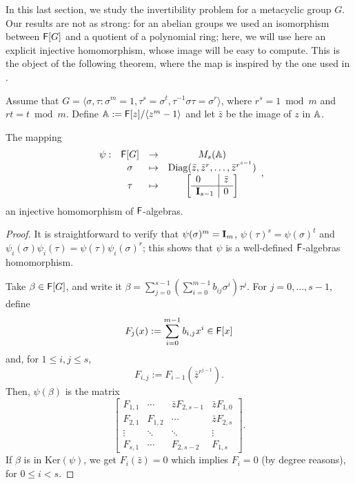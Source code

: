 In this last section, we study the invertibility problem for a
metacyclic group $G$. Our results are not as strong: for an abelian
groups we used an isomorphism between ${\mathsf{F}}[G]$ and a quotient of a
polynomial ring; here, we will use here an explicit injective
homomorphism, whose image will be easy to compute. This is the object
of the following theorem, where the map is inspired by the one used in
\cite[\S 47]{Curtis}.

Assume that $G = \langle \sigma , \tau : \sigma^m = 1, \tau^s =
\sigma^t, \tau^{-1} \sigma \tau = \sigma^r \rangle$, where $r^s = 1
\bmod m$ and $rt = t \bmod m$. Define $\mathbb{A}:={\mathsf{F}}[z]/\langle z^m-1\rangle$
and let $\bar{z}$ be the image of $z$ in $\mathbb{A}$.

\begin{lemma}\label{prop:metinjection}
The mapping
$$\begin{array}{cccc}
\psi:& \F [G]& \to& M_s(\A) \\
&\sigma &\mapsto& \mathrm{Diag}(\bar{z}, \bar{z}^r , \ldots, \bar{z}^{r^{s-1}})\\
&\tau &\mapsto &
\left[ \begin{array}{l|l}
0 & \bar{z}\\
\hline
\mat I_{s-1} & 0
\end{array}
\right]
\end{array},$$
an injective homomorphism of ${\mathsf{F}}$-algebras.
\end{lemma}
\begin{proof}
It is straightforward to verify that $\psi(\sigma)^m = \mat I_m$,
$\psi(\tau)^s = \psi(\sigma)^t$ and $\psi_i(\sigma) \psi_i(\tau)
=\psi(\tau) \psi_i(\sigma)^r$; this shows that $\psi$ is a well-defined ${\mathsf{F}}$-algebras homomorphism.

Take $\beta \in {\mathsf{F}}[G]$, and write it $\beta = \sum_{j = 0}^{s-1}
\left( \sum_{i = 0}^{m-1} b_{ij} \sigma^i \right) \tau^j$. For
$j=0,\dots,s-1$, define
$$F_j(x)
:= \sum_{i = 0}^{m-1} b_{i,j}x^i \in {\mathsf{F}}[x]$$ 
and, for $1 \leq i,j \leq s$,
$$F_{i,j} := F_{i-1}(\bar{z}^{r^{j-1}}).$$
Then, $\psi(\beta)$ is the matrix
\begin{equation}\label{eq:injection}
\left[\begin{array}{llll}
F_{1,1} &  \cdots	&	\bar{z}F_{2,s-1} & \bar{z}F_{1,0}\\
F_{2,1} & F_{1,2}& \cdots & \bar{z}F_{2,s}\\
\vdots &\ddots & \ddots& \vdots\\
F_{s,1}& \cdots & F_{2,s-2}	& F_{1,s}
\end{array}
\right].
\end{equation}
If $\beta$ is in $\mathrm{Ker}(\psi)$, we get $F_i(\bar{z}) =0$ which
implies $F_i = 0$ (by degree reasons), for $0 \leq i < s$.
\end{proof}


